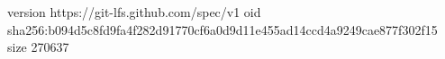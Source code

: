 version https://git-lfs.github.com/spec/v1
oid sha256:b094d5c8fd9fa4f282d91770cf6a0d9d11e455ad14ccd4a9249cae877f302f15
size 270637

